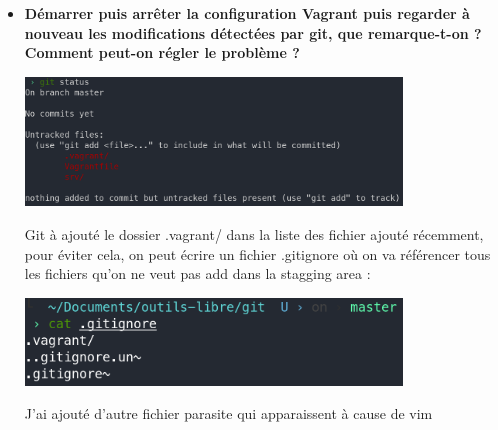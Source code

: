 \documentclass[12pt]{article}
\begin{document}
\begin{itemize}
  \item \textbf{Démarrer puis arrêter la configuration Vagrant puis regarder à nouveau les modifications détectées par git,
  que remarque-t-on ? Comment peut-on régler le problème ?}
  \vspace{0.3cm}

  \includegraphics[width=10cm]{images/screen-git-td1-4.png}
  \vspace{0.3cm}

  Git à ajouté le dossier .vagrant/ dans la liste des fichier ajouté récemment, pour éviter cela, on peut écrire un fichier
  .gitignore où on va référencer tous les fichiers qu'on ne veut pas add dans la stagging area :
  \vspace{0.3cm}

  \includegraphics[width=10cm]{images/screen-git-td1-5.png}
  \vspace{0.3cm}

  J'ai ajouté d'autre fichier parasite qui apparaissent à cause de vim
\end{itemize}
\vspace{0.3cm}
\end{document}
